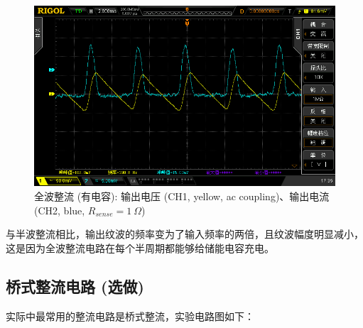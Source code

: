 \documentclass[UTF8]{article}
\begin{document}
\begin{figure}[H]\centering
    \includegraphics[width=\columnwidth]{LCE-01-二极管/assets/二极管整流电路/全波整流-接电容-电流波形.png}
    \caption{全波整流 (有电容): 输出电压 (CH1, yellow, ac coupling)、输出电流 (CH2, blue, $R_{sense} = 1\ \Omega$)}
\end{figure}

与半波整流相比，输出纹波的频率变为了输入频率的两倍，且纹波幅度明显减小，这是因为全波整流电路在每个半周期都能够给储能电容充电。

\subsection{桥式整流电路 (选做)}

实际中最常用的整流电路是桥式整流，实验电路图如下：
\end{document}

